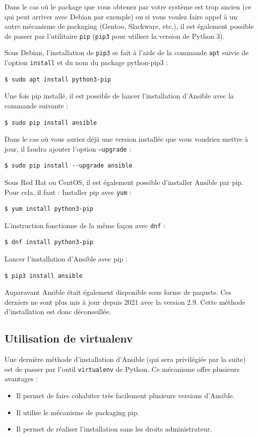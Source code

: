 \documentclass[hidelinks]{article}
\begin{document}
Dans le cas où le package que vous obtenez par votre système est trop ancien (ce qui peut arriver avec Debian par exemple) ou si vous voulez faire appel à un autre mécanisme de packaging (Gentoo, Slackware, etc.), il est également possible de passer par l'utilitaire \texttt{pip} (\texttt{pip3} pour utiliser la version de Python 3).

Sous Debian, l'installation de \texttt{pip3} se fait à l'aide de la commande \texttt{apt} suivie de l'option \texttt{install} et du nom du package python-pip3 :
\begin{verbatim}
$ sudo apt install python3-pip
\end{verbatim}

Une fois pip installé, il est possible de lancer l'installation d'Ansible avec la commande suivante :
\begin{verbatim}
$ sudo pip install ansible
\end{verbatim}

Dans le cas où vous auriez déjà une version installée que vous voudriez mettre à jour, il faudra ajouter l'option \texttt{--upgrade} :

\begin{verbatim}
$ sudo pip install --upgrade ansible
\end{verbatim}

Sous Red Hat ou CentOS, il est également possible d'installer Ansible par pip. Pour cela, il faut :
Installer pip avec \texttt{yum} :
\begin{verbatim}
$ yum install python3-pip
\end{verbatim}

L'instruction fonctionne de la même façon avec \texttt{dnf} :
\begin{verbatim}
$ dnf install python3-pip
\end{verbatim}

Lancer l'installation d'Ansible avec pip :

\begin{verbatim}
$ pip3 install ansible
\end{verbatim}

Auparavant Ansible était également disponible sous forme de paquets. Ces derniers ne sont plus mis à jour depuis 2021 avec la version 2.9. Cette méthode d'installation est donc déconseillée.

\subsection{Utilisation de virtualenv}
Une dernière méthode d'installation d'Ansible (qui sera privilégiée par la suite) est de passer par l'outil \texttt{virtualenv} de Python. Ce mécanisme offre plusieurs avantages :
\begin{itemize}
    \item Il permet de faire cohabiter très facilement plusieurs versions d'Ansible.
    \item Il utilise le mécanisme de packaging pip.
    \item Il permet de réaliser l'installation sans les droits administrateur.
\end{itemize}
\end{document}
